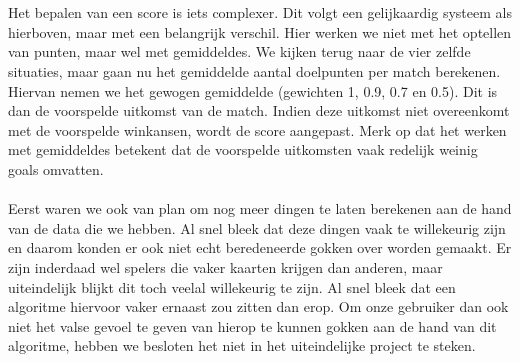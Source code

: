 \documentclass[11pt, a4paper]{article}
\begin{document}
\\
\\
Het bepalen van een score is iets complexer. Dit volgt een gelijkaardig systeem als hierboven, maar met een belangrijk verschil. Hier werken we niet met het optellen van punten, maar wel met gemiddeldes. We kijken terug naar de vier zelfde situaties, maar gaan nu het gemiddelde aantal doelpunten per match berekenen. Hiervan nemen we het gewogen gemiddelde (gewichten 1, 0.9, 0.7 en 0.5). Dit is dan de voorspelde uitkomst van de match. Indien deze uitkomst niet overeenkomt met de voorspelde winkansen, wordt de score aangepast. Merk op dat het werken met gemiddeldes betekent dat de voorspelde uitkomsten vaak redelijk weinig goals omvatten.
\\
\\
Eerst waren we ook van plan om nog meer dingen te laten berekenen aan de hand van de data die we hebben. Al snel bleek dat deze dingen vaak te willekeurig zijn en daarom konden er ook niet echt beredeneerde gokken over worden gemaakt. Er zijn inderdaad wel spelers die vaker kaarten krijgen dan anderen, maar uiteindelijk blijkt dit toch veelal willekeurig te zijn. Al snel bleek dat een algoritme hiervoor vaker ernaast zou zitten dan erop. Om onze gebruiker dan ook niet het valse gevoel te geven van hierop te kunnen gokken aan de hand van dit algoritme, hebben we besloten het niet in het uiteindelijke project te steken.
\end{document}
